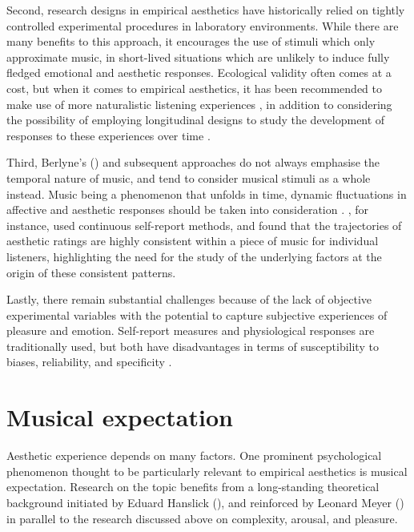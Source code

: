 Second, research designs in empirical aesthetics have historically relied on tightly controlled experimental procedures in laboratory environments. While there are many benefits to this approach, it encourages the use of stimuli which only approximate music, in short-lived situations which are unlikely to induce fully fledged emotional and aesthetic responses. Ecological validity often comes at a cost, but when it comes to empirical aesthetics, it has been recommended to make use of more naturalistic listening experiences \parencite{hargreaves2010, hodges2016}, in addition to considering the possibility of employing longitudinal designs to study the development of responses to these experiences over time \parencite{greasley2016}.

Third, Berlyne's (\citeyear{berlyne1971}) and subsequent approaches do not always emphasise the temporal nature of music, and tend to consider musical stimuli as a whole instead. Music being a phenomenon that unfolds in time, dynamic fluctuations in affective and aesthetic responses should be taken into consideration \parencite{huron2010, mcdermott2012}. \textcite{madsen1993}, for instance, used continuous self-report methods, and found that the trajectories of aesthetic ratings are highly consistent within a piece of music for individual listeners, highlighting the need for the study of the underlying factors at the origin of these consistent patterns.

Lastly, there remain substantial challenges because of the lack of objective experimental variables with the potential to capture subjective experiences of pleasure and emotion. Self-report measures and physiological responses are traditionally used, but both have disadvantages in terms of susceptibility to biases, reliability, and specificity \parencite{juslin2016, larsen2008, orne1962, panksepp2002, zentner2010}. 

\section{Musical expectation}

Aesthetic experience depends on many factors. One prominent psychological phenomenon thought to be particularly relevant to empirical aesthetics is musical expectation. Research on the topic benefits from a long-standing theoretical background initiated by Eduard Hanslick (\citeyear{hanslick1854}), and reinforced by Leonard Meyer (\citeyear{meyer1956, meyer1957}) in parallel to the research discussed above on complexity, arousal, and pleasure. 

